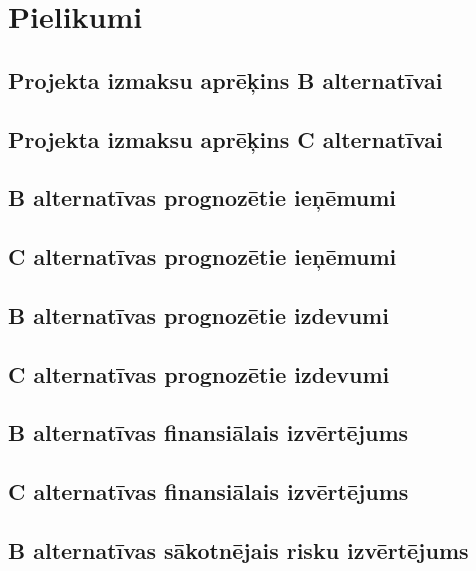\appendix
\chapter*{Pielikumi}
\renewcommand{\thesection}{\arabic{section}}
    
    
    
    
    
\section{Projekta izmaksu aprēķins B alternatīvai}
	\label{app:B_izmaksas}
    \clearpage
\section{Projekta izmaksu aprēķins C alternatīvai}
	\label{app:C_izmaksas}
    \clearpage
\section{B alternatīvas prognozētie ieņēmumi}
	\label{app:B_ienemumi}
    \clearpage
\section{C alternatīvas prognozētie ieņēmumi}
	\label{app:C_ienemumi}
    \clearpage
\section{B alternatīvas prognozētie izdevumi}
	\label{app:B_izdevumi}
    \clearpage
\section{C alternatīvas prognozētie izdevumi}
	\label{app:C_izdevumi}
    \clearpage
\section{B alternatīvas finansiālais izvērtējums}
	\label{app:B_finansialais_vertejums}
    \clearpage
\section{C alternatīvas finansiālais izvērtējums}
	\label{app:C_finansialais_vertejums}
    \clearpage
\section{B alternatīvas sākotnējais risku izvērtējums}
	\label{app:B_sakotnejie_riski}
    \clearpage
